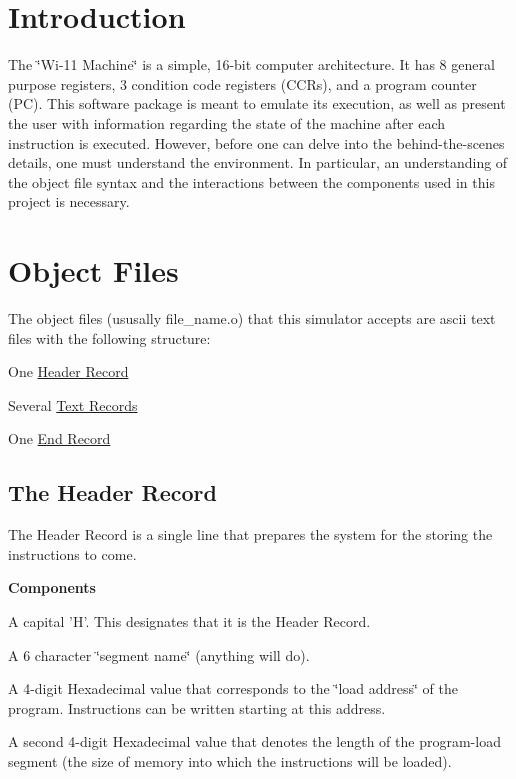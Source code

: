 \hypertarget{index_intro}{}\section{Introduction}\label{index_intro}
The \char`\"{}Wi-\/11 Machine\char`\"{} is a simple, 16-\/bit computer architecture. It has 8 general purpose registers, 3 condition code registers (CCRs), and a program counter (PC). This software package is meant to emulate its execution, as well as present the user with information regarding the state of the machine after each instruction is executed. However, before one can delve into the behind-\/the-\/scenes details, one must understand the environment. In particular, an understanding of the object file syntax and the interactions between the components used in this project is necessary.\hypertarget{index_syntax}{}\section{Object Files}\label{index_syntax}
\begin{DoxyParagraph}{}
The object files (ususally file\_\-name.o) that this simulator accepts are ascii text files with the following structure: \begin{DoxyItemize}
\item One \hyperlink{index_header}{Header Record} \item Several \hyperlink{index_text}{Text Records} \item One \hyperlink{index_end}{End Record}\end{DoxyItemize}

\end{DoxyParagraph}
\hypertarget{index_header}{}\subsection{The Header Record}\label{index_header}
\begin{DoxyParagraph}{}
The Header Record is a single line that prepares the system for the storing the instructions to come. 
\end{DoxyParagraph}
\begin{DoxyParagraph}{}
{\bfseries Components} \begin{DoxyItemize}
\item A capital 'H'. This designates that it is the Header Record. \item A 6 character \char`\"{}segment name\char`\"{} (anything will do). \item A 4-\/digit Hexadecimal value that corresponds to the \char`\"{}load address\char`\"{} of the program. Instructions can be written starting at this address. \item A second 4-\/digit Hexadecimal value that denotes the length of the program-\/load segment (the size of memory into which the instructions will be loaded). \end{DoxyItemize}

\end{DoxyParagraph}
